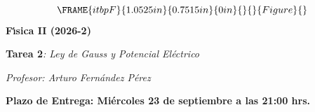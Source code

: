 \documentclass[onecolumn]{article}
\begin{document}
\begin{center}
\begin{equation*}
\FRAME{itbpF}{1.0525in}{0.7515in}{0in}{}{}{Figure}{\special{language
"Scientific Word";type "GRAPHIC";maintain-aspect-ratio TRUE;display
"USEDEF";valid_file "T";width 1.0525in;height 0.7515in;depth
0in;original-width 2.3168in;original-height 1.6466in;cropleft "0";croptop
"1";cropright "1";cropbottom "0";tempfilename
'TKA6AM00.bmp';tempfile-properties "XPR";}}
\end{equation*}%
\textbf{F\'{\i}sica II (2026-2)}

\textbf{Tarea 2}\emph{: Ley de Gauss y Potencial El\'{e}ctrico}

\textit{Profesor: Arturo Fern\'{a}ndez P\'{e}rez}

\textbf{Plazo de Entrega: Mi\'{e}rcoles 23 de septiembre a las 21:00 hrs.}
\end{center}
\end{document}
